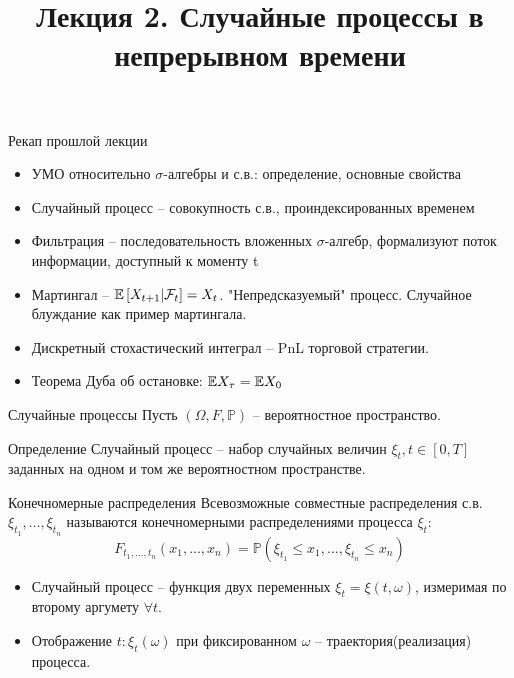 \documentclass{beamer}
\title[Случайные процессы]{Лекция 2. Случайные процессы в непрерывном времени} %
\begin{document}
\begin{frame}
\titlepage 
\end{frame}

\begin{frame}{Рекап прошлой лекции}
    \begin{itemize}
        \item УМО относительно $\sigma$-алгебры и с.в.: определение, основные свойства
        \item Случайный процесс -- совокупность с.в., проиндексированных временем
        \item Фильтрация -- последовательность вложенных $\sigma$-алгебр, формализуют поток информации, доступный к моменту t
        \item Мартингал -- $\mathbb{E} \left[ X_{t+1} | \mathcal{F}_t\right] = X_t$. "Непредсказуемый" процесс. Случайное блуждание как пример мартингала.
        \item Дискретный стохастический интеграл -- PnL торговой стратегии. 
        \item Теорема Дуба об остановке: $\mathbb{E} X_{\tau} = \mathbb{E} X_0$
    \end{itemize}
\end{frame}


\begin{frame}{Случайные процессы}
    Пусть $(\Omega, F, \mathbb{P})$ -- вероятностное пространство.
    \begin{block}{Определение}
    Случайный процесс -- набор случайных величин $\xi_t, t \in [0, T]$ заданных на одном и том же вероятностном пространстве.     
    \end{block}
    
    \begin{block}{Конечномерные распределения}
        Всевозможные совместные распределения с.в. $\xi_{t_1}, \ldots, \xi_{t_n}$ называются конечномерными распределениями процесса $\xi_t$:
        $$
            F_{t_1, \ldots, t_n} (x_1, \ldots, x_n) = \mathbb{P}(\xi_{t_1} \leq x_1, \ldots, \xi_{t_n} \leq x_n)
        $$
    \end{block}

    \begin{itemize}
        \item Случайный процесс -- функция двух переменных $\xi_t = \xi(t, \omega)$, измеримая по второму аргумету $\forall t$.
        \item Отображение $t : \xi_t(\omega)$ при фиксированном $\omega$ -- траектория(реализация) процесса.
    \end{itemize}
\end{frame}
\end{document}
